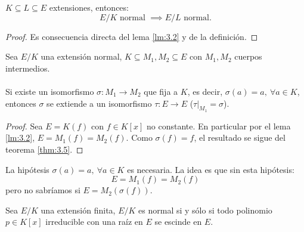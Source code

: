 
\begin{lm}\label{lm:3.7}
    $K \subseteq L \subseteq E$ extensiones, entonces:
    $$
        E/K \text{ normal } \implies E/L \text{ normal.}
    $$
\end{lm}

\begin{proof}
    Es consecuencia directa del lema \ref{lm:3.2} y de la definición.
\end{proof}


\begin{cor}\label{cor:3.8}
    Sea $E/K$ una extensión normal, $K \subseteq M_1, M_2 \subseteq E$ con $M_1, M_2$ cuerpos intermedios.\\\\
    Si existe un isomorfismo $\sigma: M_1 \to M_2$ que fija a $K$, es decir, $\sigma(a) = a,\ \forall a \in K$, entonces $\sigma$ se extiende a un isomorfismo $\tau: E \to E$ ($\left. \tau \right|_{M_1} = \sigma$).
\end{cor}
\begin{proof}
    Sea $E = K(f)$ con $f \in K[x]$ no constante. En particular por el lema \ref{lm:3.2}, $E = M_1(f) = M_2(f)$. Como $\sigma(f) = f$, el resultado se sigue del teorema \ref{thm:3.5}.
\end{proof}
\begin{obs}
    La hipótesis $\sigma(a) = a,\ \forall a \in K$ es necesaria. La idea es que sin esta hipótesis:
    $$
        E = M_1(f) = M_2(f)
    $$
    pero no sabríamos si $E = M_2(\sigma(f))$.
\end{obs}

\begin{thm}\label{thm:3.9}
    Sea $E/K$ una extensión finita, $E/K$ es normal si y sólo si todo polinomio $p \in K[x]$ irreducible con una raíz en $E$ se escinde en $E$.
\end{thm}

